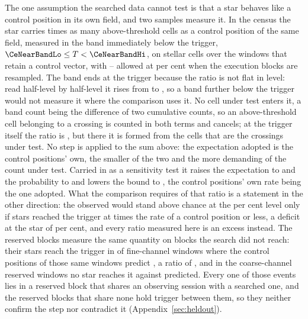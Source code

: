 The one assumption the searched data cannot test is that a star behaves like
a control position in its own field, and two samples measure it. In the census
the star carries \CeNear{} times as many above-threshold cells as a control
position of the same field, measured in the band immediately below the
trigger, $\CeNearBandLo\le T<\CeNearBandHi$, on \CeNearNStar{} stellar cells
over the \CeNearNWin{} windows that retain a control vector, with
\CeNearIntLo--\CeNearIntHi{} allowed at \CeCovPct{} per cent when the
execution blocks are resampled. The band ends at the trigger because the
ratio is not flat in level: read half-level by half-level it rises from
\CeNearRiseLo{} to \CeNearRiseHi, so a band further below the trigger would
not measure it where the comparison uses it. No cell under test enters it, a
band count being the difference of two cumulative counts, so an
above-threshold cell belonging to a crossing is counted in both terms and
cancels; at the trigger itself the ratio is \CeTrAt, but there it is formed
from the \CeStepNX{} cells that are the crossings under test. No step is
applied to the sum above: the expectation adopted is the control positions'
own, the smaller of the two and the more demanding of the count under test.
Carried in as a sensitivity test it raises the expectation to \CeExpNear{}
and the probability to \CeProbNear{} and lowers the bound to \CeAddLimNear,
the control positions' own rate being the one adopted.
What the comparison requires of that ratio is a statement in
the other direction: the \CeObs{} observed would stand above chance at the
\CeAlphaPct{} per cent level only if stars reached the trigger at \CeRCrit{}
times the rate of a control position or less, a deficit at the star of
\CeRCritPct{} per cent, and every ratio measured here is an excess instead.
The reserved blocks measure
the same quantity on blocks the search did not reach: their stars reach the
trigger in \StHoObs{} of \StHoNFine{} fine-channel windows where the control
positions of those same windows predict \StHoExpFine, a ratio of
\StHoRatio, and in the \StHoNCoarse{} coarse-channel reserved windows no
star reaches it against \StHoExpCoarse{} predicted. Every one of those
events lies in a reserved block that shares an observing session with a
searched one, and the \HsIndBlocks{} reserved blocks that share none hold
\HsIndObsWord{} trigger \HsIndObsNoun{} between them, so they neither
confirm the step nor contradict it (Appendix~\ref{sec:heldout}).

